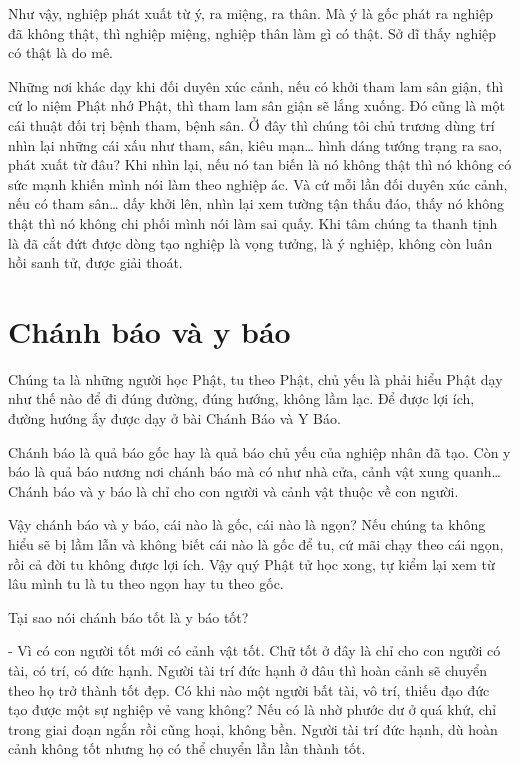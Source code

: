 \documentclass[
  12pt,
  oneside]{book}
\begin{document}
Như vậy, nghiệp phát xuất từ ý, ra miệng, ra thân. Mà ý là gốc phát ra nghiệp đã không thật, thì nghiệp miệng, nghiệp thân làm gì có thật. Sở dĩ thấy nghiệp có thật là do mê.

Những nơi khác dạy khi đối duyên xúc cảnh, nếu có khởi tham lam sân giận, thì cứ lo niệm Phật nhớ Phật, thì tham lam sân giận sẽ lắng xuống. Đó cũng là một cái thuật đối trị bệnh tham, bệnh sân. Ở đây thì chúng tôi chủ trương dùng trí nhìn lại những cái xấu như tham, sân, kiêu mạn\ldots{} hình dáng tướng trạng ra sao, phát xuất từ đâu? Khi nhìn lại, nếu nó tan biến là nó không thật thì nó không có sức mạnh khiến mình nói làm theo nghiệp ác. Và cứ mỗi lần đối duyên xúc cảnh, nếu có tham sân\ldots{} dấy khởi lên, nhìn lại xem tường tận thấu đáo, thấy nó không thật thì nó không chi phối mình nói làm sai quấy. Khi tâm chúng ta thanh tịnh là đã cắt đứt được dòng tạo nghiệp là vọng tưởng, là ý nghiệp, không còn luân hồi sanh tử, được giải thoát.

\hypertarget{chanh-bao-va-y-bao}{%
\chapter*{Chánh báo và y báo}\label{chanh-bao-va-y-bao}}

Chúng ta là những người học Phật, tu theo Phật, chủ yếu là phải hiểu Phật dạy như thế nào để đi đúng đường, đúng hướng, không lầm lạc. Để được lợi ích, đường hướng ấy được dạy ở bài Chánh Báo và Y Báo.

Chánh báo là quả báo gốc hay là quả báo chủ yếu của nghiệp nhân đã tạo. Còn y báo là quả báo nương nơi chánh báo mà có như nhà cửa, cảnh vật xung quanh\ldots{} Chánh báo và y báo là chỉ cho con người và cảnh vật thuộc về con người.

Vậy chánh báo và y báo, cái nào là gốc, cái nào là ngọn? Nếu chúng ta không hiểu sẽ bị lầm lẫn và không biết cái nào là gốc để tu, cứ mãi chạy theo cái ngọn, rồi cả đời tu không được lợi ích. Vậy quý Phật tử học xong, tự kiểm lại xem từ lâu mình tu là tu theo ngọn hay tu theo gốc.

Tại sao nói chánh báo tốt là y báo tốt?

- Vì có con người tốt mới có cảnh vật tốt. Chữ tốt ở đây là chỉ cho con người có tài, có trí, có đức hạnh. Người tài trí đức hạnh ở đâu thì hoàn cảnh sẽ chuyển theo họ trở thành tốt đẹp. Có khi nào một người bất tài, vô trí, thiếu đạo đức tạo được một sự nghiệp vẻ vang không? Nếu có là nhờ phước dư ở quá khứ, chỉ trong giai đoạn ngắn rồi cũng hoại, không bền. Người tài trí đức hạnh, dù hoàn cảnh không tốt nhưng họ có thể chuyển lần lần thành tốt.
\end{document}
